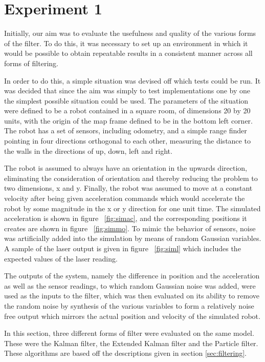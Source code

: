 \documentclass[english]{article}
\begin{document}
\section{Experiment 1}
Initially, our aim was to evaluate the usefulness and quality of the various forms of the filter. To do this, it was necessary to set up an environment in which it would be possible to obtain repeatable results in a consistent manner across all forms of filtering.

In order to do this, a simple situation was devised off which tests could be run. It was decided that since the aim was simply to test implementations one by one the simplest possible situation could be used. The parameters of the situation were defined to be a robot contained in a square room, of dimensions 20 by 20 units, with the origin of the map frame defined to be in the bottom left corner. The robot has a set of sensors, including odometry, and a simple range finder pointing in four directions orthogonal to each other, measuring the distance to the walls in the directions of up, down, left and right. 

The robot is assumed to always have an orientation in the upwards direction, eliminating the consideration of orientation and thereby reducing the problem to two dimensions, x and y. Finally, the robot was assumed to move at a constant velocity after being given acceleration commands which would accelerate the robot by some magnitude in the x or y direction for one unit time. The simulated acceleration is shown in figure ~\ref{fig:simac}, and the corresponding positions it creates are shown in figure ~\ref{fig:simmo}. To mimic the behavior of sensors, noise was artificially added into the simulation by means of random Gaussian variables. A sample of the laser output is given in figure ~\ref{fig:siml} which includes the expected values of the laser reading.

The outputs of the system, namely the difference in position and the acceleration as well as the sensor readings, to which random Gaussian noise was added, were used as the inputs to the filter, which was then evaluated on its ability to remove the random noise by synthesis of the various variables to form a relatively noise free output which mirrors the actual position and velocity of the simulated robot.

In this section, three different forms of filter were evaluated on the same model. These were the Kalman filter, the Extended Kalman filter and the Particle filter. These algorithms are based off the descriptions given in section \ref{sec:filtering}.
\end{document}
